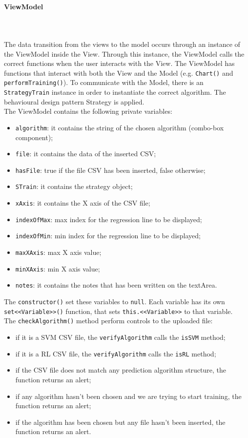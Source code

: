 \paragraph{ViewModel}\mbox{} \\ \mbox{} \\
The data transition from the views to the model occurs through an instance of the ViewModel inside the View. Through this instance, the ViewModel calls the correct functions when the user interacts with the View.
The ViewModel has functions that interact with both the View and the Model (e.g. \texttt{Chart()} and \texttt{performTraining()}).
To communicate with the Model, there is an \texttt{StrategyTrain} instance in order to instantiate the correct algorithm. The behavioural design pattern Strategy is applied. \\
The ViewModel contains the following private variables: \begin{itemize}
\item \texttt{algorithm}: it contains the string of the chosen algorithm (combo-box component);
\item \texttt{file}: it contains the data of the inserted CSV;
\item \texttt{hasFile}: true if the file CSV has been inserted, false otherwise;
\item \texttt{STrain}: it contains the strategy object;
\item \texttt{xAxis}: it contains the X axis of the CSV file;
\item \texttt{indexOfMax}: max index for the regression line to be displayed;
\item \texttt{indexOfMin}: min index for the regression line to be displayed;
\item \texttt{maxXAxis}: max X axis value;
\item \texttt{minXAxis}: min X axis value;
\item \texttt{notes}: it contains the notes that has been written on the textArea.
\end{itemize}
The \texttt{constructor()} set these variables to \texttt{null}.
Each variable has its own \texttt{set<<Variable>>()} function, that sets \texttt{this.<<Variable>>} to that variable. \\
The \texttt{checkAlgorithm()} method perform controls to the uploaded file: \begin{itemize}
\item if it is a SVM CSV file, the \texttt{verifyAlgorithm} calls the \texttt{isSVM} method;
\item if it is a RL CSV file, the \texttt{verifyAlgorithm} calls the \texttt{isRL} method;
\item if the CSV file does not match any prediction algorithm structure, the function returns an alert;
\item if any algorithm hasn't been chosen and we are trying to start training, the function returns an alert;
\item if the algorithm has been chosen but any file hasn't been inserted, the function returns an alert.
\end{itemize}
